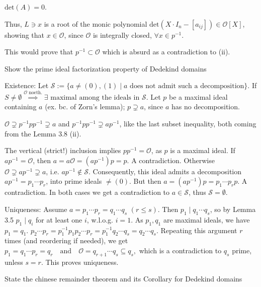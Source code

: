 \( \text{det}(A) = 0 \).

Thus, \( L \ni x \) is a root of the monic polynomial \(\text{det}(X \cdot I_n - [a_{ij}]) \in \mathcal{O}[X]\), showing that \( x \in \mathcal{O} \), since \(\mathcal{O}\) is integrally closed, \(\forall x \in p^{-1}\).

This would prove that \( p^{-1} \subset \mathcal{O} \) which is absurd as a contradiction to (ii).



Show the prime ideal factorization property of Dedekind domains

Existence:
Let \(\mathcal{S} := \{ a \neq (0), (1) \mid a \text{ does not admit such a decomposition} \}\).
If \( S \neq \emptyset \overset{\mathcal{O} \text{ noeth.}}{\implies} \exists \text{ maximal among the ideals in } \mathcal{S} \). 
Let \( p \) be a maximal ideal containing \( a \) (ex. bc. of Zorn's lemma); 
\( p \supsetneq a \), since \( a \) has no decomposition.

\(
\mathcal{O} \supsetneq p^{-1}pp^{-1} \supsetneq a
\)
and \(p^{-1}pp^{-1} \supsetneq ap^{-1}\), like the last subset inequality, both coming from the Lemma 3.8 (ii).

The vertical (strict!) inclusion implies \( pp^{-1} = \mathcal{O} \), as \( p \) is a maximal ideal.
If \( ap^{-1} = \mathcal{O} \), then
\(
a = a\mathcal{O} = (ap^{-1})p = p.
\)
A contradiction.
Otherwise \(\mathcal{O} \supsetneq ap^{-1} \supsetneq a\), i.e. \( ap^{-1} \notin \mathcal{S} \). 
Consequently, this ideal admits a decomposition \( ap^{-1} = p_1 \cdots p_r \), into prime ideals \(\neq (0) \). But then
\(
a = (ap^{-1})p = p_1 \cdots p_r p.
\)
A contradiction.
In both cases we get a contradiction to \( a \in \mathcal{S} \), thus \( \mathcal{S} = \emptyset \).

Uniqueness: Assume \( a = p_1 \cdots p_r = q_1 \cdots q_s \) \((r \leq s)\).
Then \( p_1 \mid q_1 \cdots q_s \), so by Lemma 3.5 \( p_1 \mid q_i \) 
for at least one \( i \), w.l.o.g. \( i = 1 \). As \( p_1, q_1 \) are maximal ideals, we have \( p_1 = q_1 \).
\(
p_2 \cdots p_r = p_1^{-1} p_1 p_2 \cdots p_r = p_1^{-1} q_2 \cdots q_s = q_2 \cdots q_s.
\)
Repeating this argument \( r \) times (and reordering if needed), we get
\(
p_1 = q_1 \cdots p_r = q_r \quad \text{and} \quad \mathcal{O} = q_{r+1} \cdots q_s \subseteq q_s,
\)
which is a contradiction to \( q_s \) prime, unless \( s = r \). This proves uniqueness.



State the chinese remainder theorem and its Corollary for Dedekind domains

